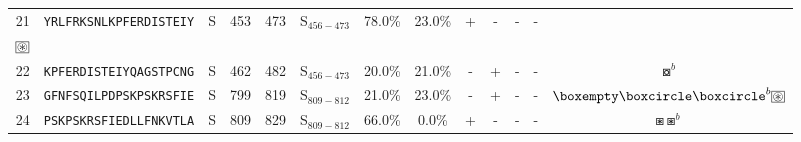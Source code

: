 \begin{tabular}{rcccccccccccc}
21 &  \texttt{YRLFRKSNLKPFERDISTEIY} &       S &    453 &   473 &  S$_{456-473}$ &                          78.0\% &                           23.0\% &          + &           - &          - &           - &               \Centerstack{  $\boxempty \boxast \boxast^b \boxcircle$ \\  $\setlength{\fboxsep}{0.5pt} \boxed{\circledast}$ } \\
22 &  \texttt{KPFERDISTEIYQAGSTPCNG} &       S &    462 &   482 &  S$_{456-473}$ &                          20.0\% &                           21.0\% &          - &           + &          - &           - &                                                                                                              $ \boxcircle^b $ \\
23 &  \texttt{GFNFSQILPDPSKPSKRSFIE} &       S &    799 &   819 &  S$_{809-812}$ &                          21.0\% &                           23.0\% &          - &           + &          - &           - &                                         $ \boxempty \boxcircle \boxcircle^b \setlength{\fboxsep}{0.5pt} \boxed{\circledast} $ \\
24 &  \texttt{PSKPSKRSFIEDLLFNKVTLA} &       S &    809 &   829 &  S$_{809-812}$ &                          66.0\% &                            0.0\% &          + &           - &          - &           - &                                                                                                         $ \boxast \boxast^b $ \\
\bottomrule
\end{tabular}
